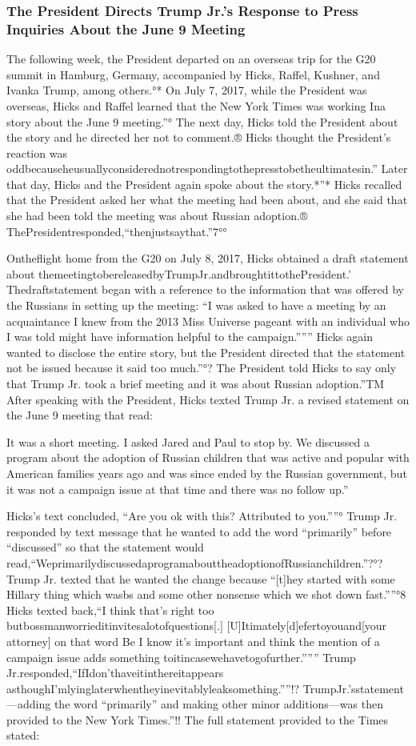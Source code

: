 \subsubsection{The President Directs Trump Jr.'s Response to Press Inquiries About the June 9 Meeting}

The following week, the President departed on an overseas trip for the G20 summit in Hamburg, Germany, accompanied by Hicks, Raffel, Kushner, and Ivanka Trump, among others.°*
On July 7, 2017, while the President was overseas, Hicks and Raffel learned that the New York Times was working Ina story about the June 9 meeting.”°
The next day, Hicks told the President about the story and he directed her not to comment.®
Hicks thought the President's reaction was oddbecauseheusuallyconsiderednotrespondingtothepresstobetheultimatesin.” Later that day, Hicks and the President again spoke about the story.*”*
Hicks recalled that the President asked her what the meeting had been about, and she said that she had been told the meeting was about Russian adoption.® ThePresidentresponded,“thenjustsaythat.”7°°

Ontheflight home from the G20 on July 8, 2017, Hicks obtained a draft statement about themeetingtobereleasedbyTrumpJr.andbroughtittothePresident.' Thedraftstatement began with a reference to the information that was offered by the Russians in setting up the meeting: “I was asked to have a meeting by an acquaintance I knew from the 2013 Miss Universe pageant with an individual who I was told might have information helpful to the campaign.””” Hicks again wanted to disclose the entire story, but the President directed that the statement not be
issued because it said too much.”°? The President told Hicks to say only that Trump Jr. took a brief meeting and it was about Russian adoption.”TM
After speaking with the President, Hicks texted Trump Jr. a revised statement on the June 9 meeting that read:

It was a short meeting. I asked Jared and Paul to stop by. We discussed a program about the adoption of Russian children that was active and popular with American families years ago and was since ended by the Russian government, but it was not a campaign issue at that time and there was no follow up.”

Hicks's text concluded, “Are you ok with this? Attributed to you.””°
Trump Jr. responded by text message that he wanted to add the word “primarily” before “discussed” so that the statement would read,“WeprimarilydiscussedaprogramabouttheadoptionofRussianchildren.”?°?
Trump Jr. texted that he wanted the change because “[t]hey started with some Hillary thing which wasbs and some other nonsense which we shot down fast.””°8 Hicks texted back,“I think that's right too butbossmanworrieditinvitesalotofquestions[.]
[U]Itimately[d]efertoyouand[your attorney] on that word Be I know it's important and think the mention of a campaign issue adds something toitincasewehavetogofurther.”””
Trump Jr.responded,“IfIdon'thaveitinthereitappears asthoughI'mlyinglaterwhentheyinevitablyleaksomething.””!?
TrumpJr.'sstatement—adding the word “primarily” and making other minor additions—was then provided to the New York Times.”!!
The full statement provided to the Times stated:

